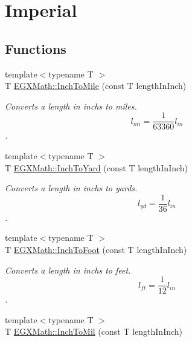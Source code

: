 \hypertarget{group___e_g_x_math-_conversions-_length_conversions-_imperial-_inch-_imperial}{}\section{Imperial}
\label{group___e_g_x_math-_conversions-_length_conversions-_imperial-_inch-_imperial}
\subsection*{Functions}
\begin{DoxyCompactItemize}
\item 
{\footnotesize template$<$typename T $>$ }\\T \mbox{\hyperlink{group___e_g_x_math-_conversions-_length_conversions-_imperial-_inch-_imperial_gabd202023ddba57d2cf3f7a142aa62bf8}{E\+G\+X\+Math\+::\+Inch\+To\+Mile}} (const T length\+In\+Inch)
\begin{DoxyCompactList}\small\item\em Converts a length in inchs to miles. \[ l_{mi}=\frac{1}{63360} l_{in} \]. \end{DoxyCompactList}\item 
{\footnotesize template$<$typename T $>$ }\\T \mbox{\hyperlink{group___e_g_x_math-_conversions-_length_conversions-_imperial-_inch-_imperial_gab2785bf628009109ea63c917397834fb}{E\+G\+X\+Math\+::\+Inch\+To\+Yard}} (const T length\+In\+Inch)
\begin{DoxyCompactList}\small\item\em Converts a length in inchs to yards. \[ l_{yd}= \frac{1}{36} l_{in} \]. \end{DoxyCompactList}\item 
{\footnotesize template$<$typename T $>$ }\\T \mbox{\hyperlink{group___e_g_x_math-_conversions-_length_conversions-_imperial-_inch-_imperial_gafb7c73e11f7d4c0c71dd62ee4a02267d}{E\+G\+X\+Math\+::\+Inch\+To\+Foot}} (const T length\+In\+Inch)
\begin{DoxyCompactList}\small\item\em Converts a length in inchs to feet. \[ l_{ft}= \frac{1}{12} l_{in} \]. \end{DoxyCompactList}\item 
{\footnotesize template$<$typename T $>$ }\\T \mbox{\hyperlink{group___e_g_x_math-_conversions-_length_conversions-_imperial-_inch-_imperial_ga87110f96478b747855d7c022ad06818b}{E\+G\+X\+Math\+::\+Inch\+To\+Mil}} (const T length\+In\+Inch)

\end{DoxyCompactItemize}
